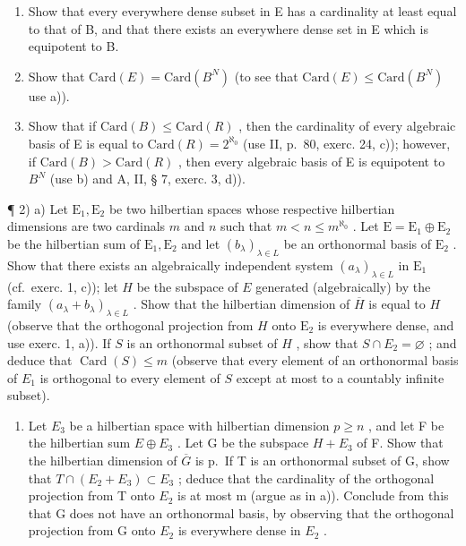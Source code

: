 \begin{enumerate}
\def\labelenumi{\alph{enumi})}
\tightlist
\item
  Show that every everywhere dense subset in E has a cardinality at least equal to that of B, and that there exists an everywhere dense set in E which is equipotent to B.
\item
  Show that \(\text{Card}(E) = \text{Card}(B^{N})\) (to see that \(\text{Card}(E) \leqslant \text{Card}(B^{N})\) use a)).
\item
  Show that if \(\text{Card}(B) \leqslant \text{Card}(R)\) , then the cardinality of every algebraic basis of E is equal to \(\text{Card}(R) = 2^{\aleph_{0}}\) (use II, p.~80, exerc. 24, c)); however, if \(\text{Card}(B) > \text{Card}(R)\) , then every algebraic basis of E is equipotent to \(B^{N}\) (use b) and A, II, § 7, exerc. 3, d)).
\end{enumerate}

¶ 2) a) Let \(\mathrm{E}_1, \mathrm{E}_2\) be two hilbertian spaces whose respective hilbertian dimensions are two cardinals \(m\) and \(n\) such that \(m < n \leqslant m^{\aleph_{0}}\) . Let \(\mathrm{E} = \mathrm{E}_1 \oplus \mathrm{E}_2\) be the hilbertian sum of \(\mathrm{E}_1, \mathrm{E}_2\) and let \((b_\lambda)_{\lambda \in L}\) be an orthonormal basis of \(\mathrm{E}_2\) . Show that there exists an algebraically independent system \((a_\lambda)_{\lambda \in L}\) in \(\mathrm{E}_1\) (cf.~exerc. 1, c)); let \(H\) be the subspace of \(E\) generated (algebraically) by the family \((a_\lambda + b_\lambda)_{\lambda \in L}\) . Show that the hilbertian dimension of \(\overline{H}\) is equal to \(H\) (observe that the orthogonal projection from \(H\) onto \(\mathrm{E}_2\) is everywhere dense, and use exerc. 1, a)). If \(S\) is an orthonormal subset of \(H\) , show that \(S \cap E_2 = \varnothing\) ; and deduce that \(\operatorname{Card}(S) \leqslant m\) (observe that every element of an orthonormal basis of \(E_1\) is orthogonal to every element of \(S\) except at most to a countably infinite subset).

\begin{enumerate}
\def\labelenumi{\alph{enumi})}
\setcounter{enumi}{1}
\tightlist
\item
  Let \(E_{3}\) be a hilbertian space with hilbertian dimension \(p \geqslant n\) , and let F be the hilbertian sum \(E \oplus E_{3}\) . Let G be the subspace \(H + E_{3}\) of F. Show that the hilbertian dimension of \(\overline{G}\) is p.~If T is an orthonormal subset of G, show that \(T \cap (E_{2} + E_{3}) \subset E_{3}\) ; deduce that the cardinality of the orthogonal projection from T onto \(E_{2}\) is at most m (argue as in a)). Conclude from this that G does not have an orthonormal basis, by observing that the orthogonal projection from G onto \(E_{2}\) is everywhere dense in \(E_{2}\) .
\end{enumerate}


